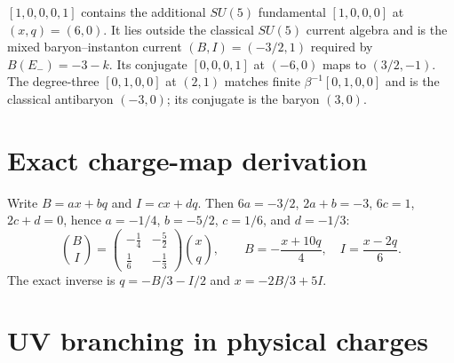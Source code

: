 \documentclass{article}
\begin{document}
$[1,0,0,0,1]$ contains the additional $SU(5)$ fundamental $[1,0,0,0]$ at $(x,q)=(6,0)$. It lies outside the classical $SU(5)$ current algebra and is the mixed baryon--instanton current $(B,I)=(-3/2,1)$ required by $B(E_-)=-3-k$. Its conjugate $[0,0,0,1]$ at $(-6,0)$ maps to $(3/2,-1)$. The degree-three $[0,1,0,0]$ at $(2,1)$ matches finite $\beta^{-1}[0,1,0,0]$ and is the classical antibaryon $(-3,0)$; its conjugate is the baryon $(3,0)$.
\section{Exact charge-map derivation} Write $B=ax+bq$ and $I=cx+dq$. Then $6a=-3/2$, $2a+b=-3$, $6c=1$, $2c+d=0$, hence $a=-1/4$, $b=-5/2$, $c=1/6$, and $d=-1/3$:
\[\binom BI=\begin{pmatrix}-\frac14&-\frac52\\\frac16&-\frac13\end{pmatrix}\binom xq,\qquad B=-\frac{x+10q}{4},\quad I=\frac{x-2q}{6}.\]
The exact inverse is $q=-B/3-I/2$ and $x=-2B/3+5I$.

\section{UV branching in physical charges}
\end{document}
